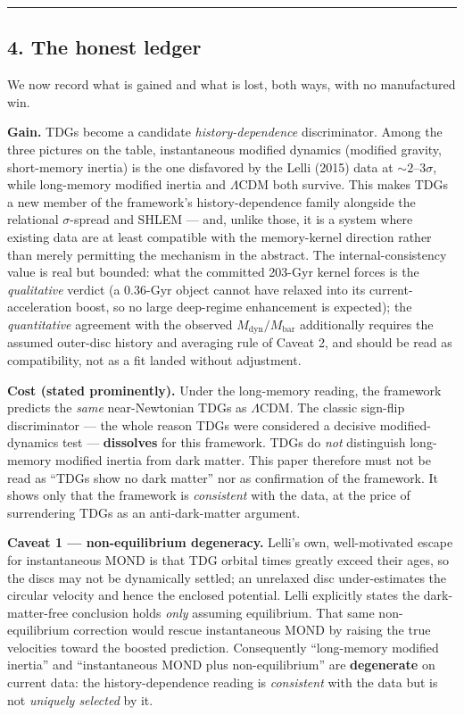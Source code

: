 \documentclass[
]{article}
\begin{document}
\begin{center}\rule{0.5\linewidth}{0.5pt}\end{center}

\subsection{4. The honest ledger}\label{the-honest-ledger}

We now record what is gained and what is lost, both ways, with no
manufactured win.

\textbf{Gain.} TDGs become a candidate \emph{history-dependence}
discriminator. Among the three pictures on the table, instantaneous
modified dynamics (modified gravity, short-memory inertia) is the one
disfavored by the Lelli (2015) data at \(\sim\!2\)--\(3\sigma\), while
long-memory modified inertia and \(\Lambda\)CDM both survive. This makes
TDGs a new member of the framework's history-dependence family alongside
the relational \(\sigma\)-spread and SHLEM --- and, unlike those, it is
a system where existing data are at least compatible with the
memory-kernel direction rather than merely permitting the mechanism in
the abstract. The internal-consistency value is real but bounded: what
the committed 203-Gyr kernel forces is the \emph{qualitative} verdict (a
0.36-Gyr object cannot have relaxed into its current-acceleration boost,
so no large deep-regime enhancement is expected); the
\emph{quantitative} agreement with the observed
\(M_\mathrm{dyn}/M_\mathrm{bar}\) additionally requires the assumed outer-disc
history and averaging rule of Caveat 2, and should be read as
compatibility, not as a fit landed without adjustment.

\textbf{Cost (stated prominently).} Under the long-memory reading, the
framework predicts the \emph{same} near-Newtonian TDGs as
\(\Lambda\)CDM. The classic sign-flip discriminator --- the whole reason
TDGs were considered a decisive modified-dynamics test ---
\textbf{dissolves} for this framework. TDGs do \emph{not} distinguish
long-memory modified inertia from dark matter. This paper therefore must
not be read as ``TDGs show no dark matter'' nor as confirmation of the
framework. It shows only that the framework is \emph{consistent} with
the data, at the price of surrendering TDGs as an anti-dark-matter
argument.

\textbf{Caveat 1 --- non-equilibrium degeneracy.} Lelli's own,
well-motivated escape for instantaneous MOND is that TDG orbital times
greatly exceed their ages, so the discs may not be dynamically settled;
an unrelaxed disc under-estimates the circular velocity and hence the
enclosed potential. Lelli explicitly states the dark-matter-free
conclusion holds \emph{only} assuming equilibrium. That same
non-equilibrium correction would rescue instantaneous MOND by raising
the true velocities toward the boosted prediction. Consequently
``long-memory modified inertia'' and ``instantaneous MOND plus
non-equilibrium'' are \textbf{degenerate} on current data: the
history-dependence reading is \emph{consistent} with the data but is not
\emph{uniquely selected} by it.
\end{document}
